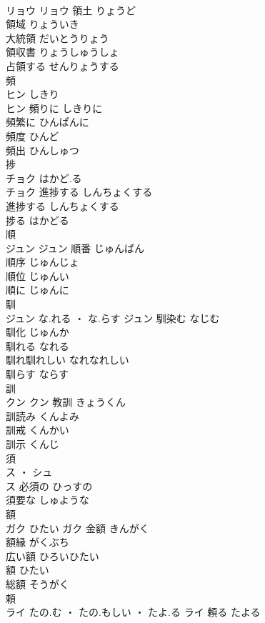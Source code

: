 \documentclass[8pt]{extreport}
\begin{document}
\begin{CJK}{UTF8}{min}
\\	リョウ		リョウ	領土	りょうど	
\\	領域	りょういき	
\\	大統領	だいとうりょう	
\\	領収書	りょうしゅうしょ	
\\	占領する	せんりょうする	
\\	頻	
\\	ヒン	しきり
\\	ヒン	頻りに	しきりに	
\\	頻繁に	ひんぱんに	
\\	頻度	ひんど	
\\	頻出	ひんしゅつ	
\\	捗	
\\	チョク	はかど.る
\\	チョク	進捗する	しんちょくする	
\\	進捗する	しんちょくする	
\\	捗る	はかどる	
\\	順	
\\	ジュン		ジュン	順番	じゅんばん	
\\	順序	じゅんじょ	
\\	順位	じゅんい	
\\	順に	じゅんに	
\\	馴	
\\	ジュン	な.れる ・ な.らす	ジュン	馴染む	なじむ	
\\	馴化	じゅんか	
\\	馴れる	なれる	
\\	馴れ馴れしい	なれなれしい	
\\	馴らす	ならす	
\\	訓	
\\	クン		クン	教訓	きょうくん	
\\	訓読み	くんよみ	
\\	訓戒	くんかい	
\\	訓示	くんじ	
\\	須	
\\	ス ・ シュ
\\	ス	必須の	ひっすの	
\\	須要な	しゅような	
\\	額	
\\	ガク	ひたい	ガク	金額	きんがく	
\\	額縁	がくぶち	
\\	広い額	ひろいひたい	
\\	額	ひたい	
\\	総額	そうがく	
\\	頼	
\\	ライ	たの.む ・ たの.もしい ・ たよ.る	ライ	頼る	たよる	

\end{CJK}
\end{document}

